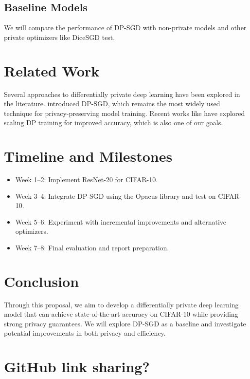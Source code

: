 \documentclass{article}
\begin{document}
    \subsection{Baseline Models}\label{subsec:baseline-models}
    We will compare the performance of DP-SGD with non-private models and other private optimizers like DiceSGD test.


    \section{Related Work}\label{sec:related-work}
    Several approaches to differentially private deep learning have been explored in the literature. \citet{Abadi_2016_DeepLearningDifferentialPrivacy}
    introduced DP-SGD, which remains the most widely used technique for privacy-preserving model training.
    Recent works like \citet{De_2022_ScaleDP_ImageClassification} have explored scaling DP training for improved accuracy, which is also one of our goals.


    \section{Timeline and Milestones}\label{sec:timeline-and-milestones}
    \begin{itemize}
        \item Week 1--2: Implement ResNet-20 for CIFAR-10.
        \item Week 3--4: Integrate DP-SGD using the Opacus library and test on CIFAR-10.
        \item Week 5--6: Experiment with incremental improvements and alternative optimizers.
        \item Week 7--8: Final evaluation and report preparation.
    \end{itemize}


    \section{Conclusion}\label{sec:conclusion}
    Through this proposal, we aim to develop a differentially private deep learning model that can achieve
    state-of-the-art accuracy on CIFAR-10 while providing strong privacy guarantees.
    We will explore DP-SGD as a baseline and investigate potential improvements in both privacy and efficiency.

    
    


    \section*{GitHub link sharing?}
\end{document}
